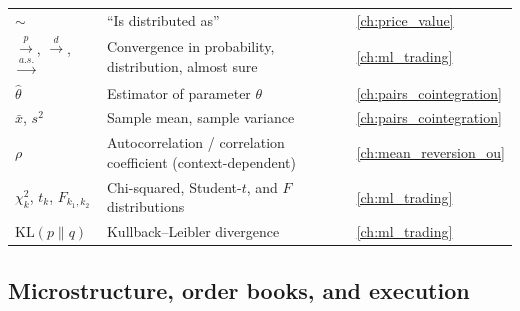 \begin{longtable}{@{}l >{\raggedright\arraybackslash}p{} l@{}}
$\sim$ & ``Is distributed as'' & \cref{ch:price_value} \\
$\xrightarrow{p}$, $\xrightarrow{d}$, $\xrightarrow{a.s.}$ & Convergence in probability, distribution, almost sure & \cref{ch:ml_trading} \\
$\hat{\theta}$ & Estimator of parameter $\theta$ & \cref{ch:pairs_cointegration} \\
$\bar{x}$, $s^2$ & Sample mean, sample variance & \cref{ch:pairs_cointegration} \\
$\rho$ & Autocorrelation / correlation coefficient (context-dependent) & \cref{ch:mean_reversion_ou} \\
$\chi^2_k$, $t_k$, $F_{k_1,k_2}$ & Chi-squared, Student-$t$, and $F$ distributions & \cref{ch:ml_trading} \\
$\text{KL}(p\|q)$ & Kullback--Leibler divergence & \cref{ch:ml_trading} \\
\bottomrule
\end{longtable}

\subsection{Microstructure, order books, and execution}


